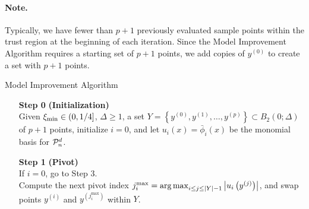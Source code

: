 \paragraph*{Note.}
Typically,  we have fewer than $p+1$ previously evaluated sample points within the trust region at the beginning of each iteration.
Since the Model Improvement Algorithm requires a starting set of $p+1$ points, 
we add copies of $y^{(0)}$ to create a set with $p+1$ points.

{
\begin{fullwidth}[leftmargin=0in, rightmargin=0in, width=\linewidth-0.35in]
\begin{flushleft}

\begin{algorithm}[H]
    \caption{Model Improvement Algorithm \label{alg:model_improvement} }
    \label{model_improving_algorithm}
    \begin{itemize}
        \item[\textbf{Step 0}] \textbf{(Initialization)} \\
            Given $\xi_{\text{min}} \in (0,1/4]$, $\Delta \ge 1$, a set $Y = \left\{y^{(0)}, y^{(1)}, \ldots, y^{(p)}\right\} \subset B_2(0;\Delta)$ of $p+1$ points,
            initialize $i=0$, and let $u_i(x)= \bar \phi_i(x)$ be the monomial basis for $\mathcal{P}^d_n$.
		\item[\textbf{Step 1}] \textbf{(Pivot)} \\
			If $i = 0$, go to Step 3. \\
			Compute the next pivot index $j^{\textrm{max}}_i = \operatorname*{arg\,max}_{i \le j \le |Y|-1} \left|u_i\left(y^{(j)}\right)\right|$,
			and swap points $y^{(i)}$ and $y^{(j^{\textrm{max}}_i)}$ within $Y$.
			

\end{itemize}
\end{algorithm}
\end{flushleft}
\end{fullwidth}}
